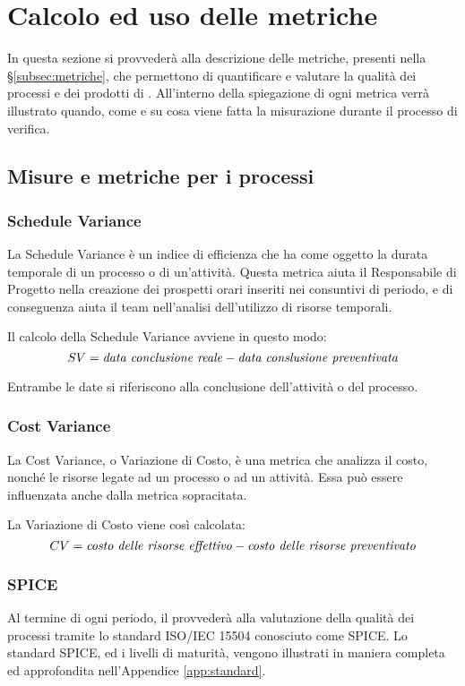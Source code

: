 \section{Calcolo ed uso delle metriche}
\label{metricheDettaglio}

	In questa sezione si provvederà alla descrizione delle metriche, presenti nella §\ref{subsec:metriche}, 
	che permettono di quantificare e valutare la qualità dei processi e dei prodotti di \GroupName{}.
	All'interno della spiegazione di ogni metrica verrà illustrato quando, come e su cosa viene fatta 
	la misurazione durante il processo di verifica.

	\subsection{Misure e metriche per i processi}

		\subsubsection{Schedule Variance}
			La Schedule Variance è un indice di efficienza che ha come oggetto la durata temporale 
			di un processo o di un'attività. Questa metrica aiuta il Responsabile di Progetto nella 
			creazione dei prospetti orari inseriti nei consuntivi di periodo, e di conseguenza aiuta 
			il team nell'analisi dell'utilizzo di risorse temporali.

			Il calcolo della Schedule Variance avviene in questo modo:
			\[SV = \mbox{\textit{data conclusione reale}} - \mbox{\textit{data conslusione preventivata}}\]


			Entrambe le date si riferiscono alla conclusione dell'attività o del processo.

		\subsubsection{Cost Variance}
			La Cost Variance, o Variazione di Costo, è una metrica che analizza il costo, nonché le risorse 
			legate ad un processo o ad un attività. Essa può essere influenzata anche dalla metrica sopracitata.

			La Variazione di Costo viene così calcolata:
			\[ CV = \mbox{\textit{costo delle risorse effettivo}} - \mbox{\textit{costo delle risorse preventivato}}\]


		\subsubsection{SPICE}
			Al termine di ogni periodo, il  \GroupName{} provvederà alla valutazione della 
			qualità dei processi tramite lo standard ISO/IEC 15504 conosciuto come SPICE.
			Lo standard SPICE, ed i livelli di maturità, vengono illustrati in maniera completa ed approfondita 
			nell'Appendice \ref{app:standard}.

